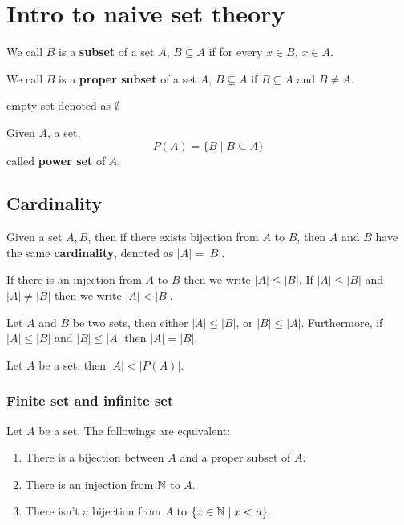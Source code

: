 \chapter{Intro to naive set theory}

\begin{definition}
  We call $B$ is a \textbf{subset} of a set $A$, $B \subseteq A$ if for every $x \in B$, $x \in A$.

  We call $B$ is a \textbf{proper subset} of a set $A$, $B \subsetneq A$ if $B \subseteq A$ and $B \neq A$.
\end{definition}

\begin{definition}
  empty set denoted as $\emptyset$ 
\end{definition}

\begin{definition}
  Given $A$, a set,  
  \[P(A) = \{B \mid B \subseteq A\}\]
  called \textbf{power set} of $A$.
\end{definition}

\section{Cardinality}
\begin{definition}
  Given a set $A, B$, then if there exists bijection from $A$ to $B$,
  then $A$ and $B$ have the same \textbf{cardinality}, denoted as $|A| = |B|$.
\end{definition}

\begin{definition}
  If there is an injection from $A$ to $B$ then we write $|A| \le |B|$.
If $|A| \le |B|$ and $|A| \neq |B|$ then we write $|A| < |B|$.
\end{definition}

\begin{theorem}
  Let $A$ and $B$ be two sets, then either $|A| \le |B|$, or $|B| \le |A|$.
Furthermore, if $|A| \le |B|$ and $|B| \le |A|$ then $|A| = |B|$.
\end{theorem}

\begin{theorem}
  Let $A$ be a set, then $|A| < |P(A)|$.
\end{theorem}

\subsection{Finite set and infinite set}

\begin{theorem}
Let $A$ be a set. The followings are equivalent:
\begin{enumerate}
  \item There is a bijection between $A$ and a proper subset of $A$.
  \item There is an injection from $\mathbb N$ to $A$.
  \item There isn't a bijection from $A$ to $\{x \in \mathbb N \mid x < n\}$.
\end{enumerate}
\end{theorem}

